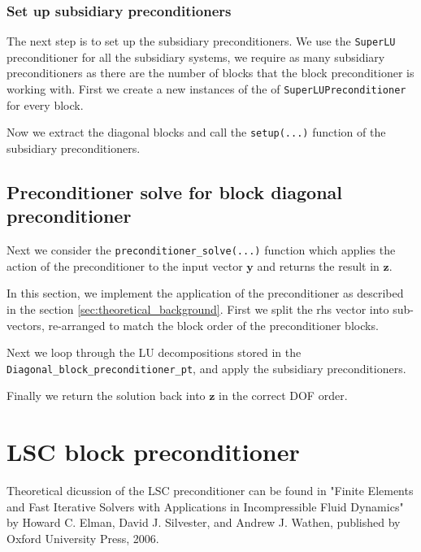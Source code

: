 \subsubsection{Set up subsidiary preconditioners\label{sec:set_up_subsidiary_preconditioners}}
The next step is to set up the subsidiary preconditioners. We use the \verb+SuperLU+ preconditioner for all the subsidiary systems, we require as many subsidiary preconditioners as there are the number of blocks that the block preconditioner is working with. First we create a new instances of the of \verb+SuperLUPreconditioner+ for every block.

Now we extract the diagonal blocks and call the \verb+setup(...)+ function of the subsidiary preconditioners.


\subsection{Preconditioner solve for block diagonal preconditioner\label{sec:preconditioner_solve_for_block_diagonal_preconditioner}}
Next we consider the \verb+preconditioner_solve(...)+ function which applies the action of the preconditioner to the input vector $\mathbf{y}$ and returns the result in $\mathbf{z}$.

In this section, we implement the application of the preconditioner as described in the section \ref{sec:theoretical_background}. First we split the rhs vector into sub-vectors, re-arranged to match the block order of the preconditioner blocks.

Next we loop through the LU decompositions stored in the \verb+Diagonal_block_preconditioner_pt+, and apply the subsidiary preconditioners.

Finally we return the solution back into $\mathbf{z}$ in the correct DOF order.



\section{LSC block preconditioner\label{sec:lsc_block_preconditioner}}
Theoretical dicussion of the LSC preconditioner can be found in "Finite Elements and Fast Iterative Solvers with Applications in Incompressible Fluid 
Dynamics" by Howard C. Elman, David J. Silvester, and Andrew J. Wathen,
published by Oxford University Press, 2006.


